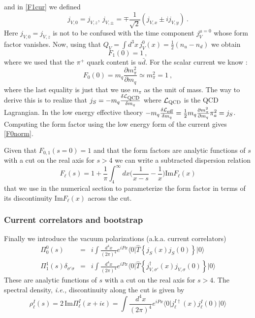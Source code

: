 \documentclass[12pt,letterpaper]{article}
\newcommand{\bra}[1]{\mbox{$\langle #1 |$}}
\newcommand{\ket}[1]{\mbox{$| #1 \rangle$}}
\newcommand{\beq}{\begin{equation}}
\newcommand{\eeq}{\end{equation}}
\newcommand{\beqa}{\begin{eqnarray}}
\newcommand{\eeqa}{\end{eqnarray}}
\newcommand{\cL}{{\cal L}}
\newcommand{\half}{\ensuremath{\frac{1}{2}}}
\renewcommand{\Im}{\ensuremath{\mathrm{Im}}}
\begin{document}
  and in \eqref{F1cur} we defined
  \beq
   j_{V,0}=j_{V,z}, \ j_{V,\pm}=\mp\frac{1}{\sqrt{2}} (j_{V,x}\pm i j_{V,y})\ . \label{h21}
  \eeq
   Here $j_{V,0}=j_{V,z}$ is not to be confused with the time component $j^{\mu=0}_V$ whose form factor vanishes.  Now, using that $Q_V=\int d^3 x\, j^0_V(x)=\half(n_u-n_d)$ we obtain
   \beq\label{F1norm}
   F_1(0)=1\ ,
   \eeq
   where we used that the $\pi^+$ quark content is $u\bar{d}$. For the scalar current we know \cite{DONOGHUE1990341,Ananthanarayan_2004}:
   \beq\label{F0norm}
    F_0(0)=m_q\frac{\partial m_\pi^2}{\partial m_q} \simeq m_\pi^2 = 1\ ,
   \eeq
   where the last equality is just that we use $m_\pi$ as the unit of mass.  The way to derive this is to realize that $j_S = -m_q\frac{\delta \cL_{\mbox{\scriptsize QCD}}}{\delta m_q}$ where $\cL_{\mbox{\scriptsize QCD}}$ is the QCD Lagrangian. 
   	In the low energy effective theory $-m_q\frac{\delta \cL_{\mbox{\scriptsize eff}}}{\delta m_q}=\half m_q \frac{\partial m_{\pi}^2}{\partial m_q} \pi_a^2=j_S$. Computing the form factor using the low energy form of the current gives \eqref{F0norm}. 
   	
   	Given that $F_{0,1}(s=0)=1$ and that the form factors are analytic functions of $s$ with a cut on the real axis for $s>4$ we can write a subtracted dispersion relation 
   	\begin{equation}\label{Fdisp}
   	F_{\ell}(s)=1+\frac{1}{\pi}\int_4^{\infty}\!\!\! dx\bigg(\frac{1}{x-s}-\frac{1}{x}\bigg)\text{Im}F_{\ell}(x)
   	\end{equation}
   that we use in the numerical section to parameterize the form factor in terms of its discontinuity $\text{Im}F_{\ell}(x)$ across the cut. 
   	
   \subsubsection{Current correlators and bootstrap}
   Finally we introduce the vacuum polarizations (a.k.a. current correlators)
   \begin{subequations}
   	   \beqa
   	\Pi^0_0(s) &=& i\int \frac{d^4x}{(2\pi)^4} e^{iPx} \bra{0} \hat{T}\left\{j_S(x)j_S(0)\right\}\ket{0} \label{cc1}\\ 
   	\Pi^1_1(s) \delta_{\sigma'\sigma} &=& i\int \frac{d^4x}{(2\pi)^4} e^{iPx} \bra{0} \hat{T}\left\{j_{V,\sigma'}^\dagger(x)j_{V,\sigma}(0)\right\}\ket{0} \label{cc2}
   	\eeqa
   \end{subequations}
   These are analytic functions of $s$ with a cut on the real axis for $s>4$. The spectral density, {\it i.e.,} discontinuity along the cut is given by
   \beq\label{h22}
     \rho^I_\ell(s) = 2\, \Im \Pi^I_\ell(x+i\epsilon) = \int\frac{d^4 x}{(2\pi)^4} e^{iPx} \bra{0} j_\ell^{I \dagger}(x) j^I_\ell(0)\ket{0}
   \eeq
   
\end{document}
